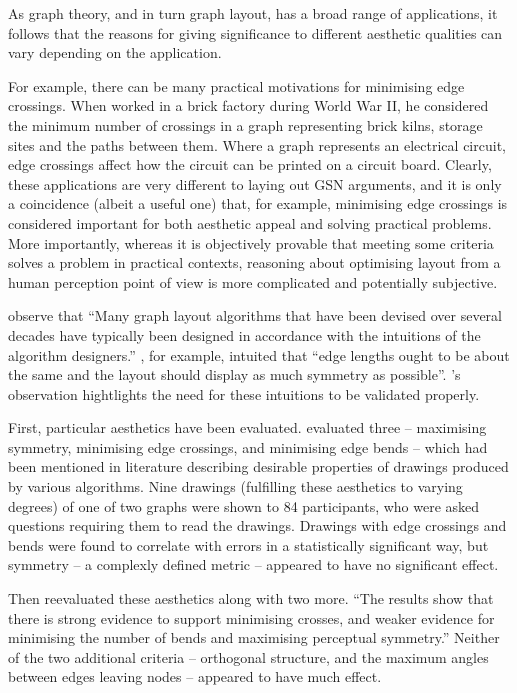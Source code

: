 \begin{itemize*}
As graph theory, and in turn graph layout, has a broad range of applications, it follows that the reasons for giving significance to different aesthetic qualities can vary depending on the application.

For example, there can be many practical motivations for minimising edge crossings.
When \citet{JGT:JGT3190010105} worked in a brick factory during World War II,
he considered the minimum number of crossings in a graph representing
brick kilns, storage sites and the paths between them.
Where a graph represents an electrical circuit, edge crossings affect how the circuit can be printed on a circuit board.
Clearly, these applications are very different to laying out GSN arguments, and it is only a coincidence (albeit a useful one) that, for example, minimising edge crossings is considered important for both aesthetic appeal and solving practical problems.
More importantly, whereas it is objectively provable that meeting some criteria solves a problem in practical contexts, reasoning about optimising layout from a human perception point of view is more complicated and potentially subjective.

\citet{5674033} observe that ``Many graph layout algorithms that have been devised over
several decades have typically been designed in accordance with the intuitions of the algorithm designers.''
\citet{eades84}, for example, intuited that ``edge lengths ought to be about the same and the layout should display as much symmetry as possible''.
\citeauthor{5674033}'s observation hightlights the need for these intuitions to be validated properly.

First, particular aesthetics have been evaluated. \citet{Purchase1997basis} evaluated three -- maximising symmetry, minimising edge crossings, and minimising edge bends -- which had been mentioned in literature describing desirable properties of drawings produced by various algorithms. 
Nine drawings (fulfilling these aesthetics to varying degrees) of one of two graphs were shown to 84 participants,
who were asked questions requiring them to read the drawings.
Drawings with edge crossings and bends were found to correlate with errors in a statistically significant way, but symmetry -- a complexly defined metric -- appeared to have no significant effect.

Then \citet{Purchase1997which} reevaluated these aesthetics along with two more. ``The results show that there is strong
evidence to support minimising crosses, and weaker evidence for minimising the number of bends and maximising perceptual symmetry.''
Neither of the two additional criteria -- orthogonal structure, and the maximum angles between edges leaving nodes -- appeared to have much effect.


\end{itemize*}
